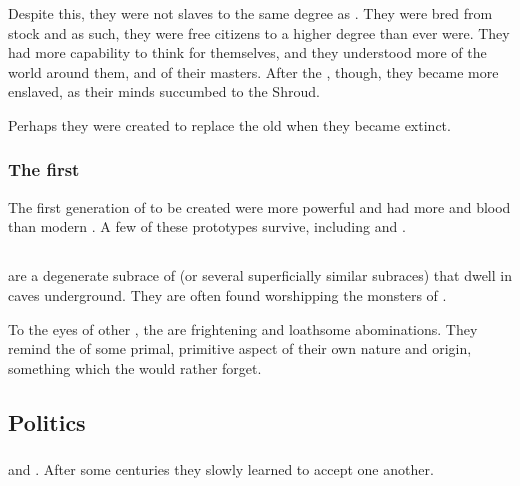 Despite this, they were not slaves to the same degree as \humans. 
They were bred from \naga{} stock and as such, they were free citizens to a higher degree than \humans{} ever were. 
They had more capability to think for themselves, and they understood more of the world around them, and of their masters. 
After the , though, they became more enslaved, as their minds succumbed to the Shroud.

Perhaps they were created to replace the old  when they became extinct. 





\subsubsection{The first \scathae}
The first generation of \scathae{} to be created were more powerful and had more \draconian{} and \xsic{} blood than modern \scathae. A few of these prototypes survive, including  and . 









\subsection{\Troglodytes}
\index{\troglodyte}
\Troglodytes{} are a degenerate subrace of \scathae{} (or several superficially similar subraces) that dwell in caves underground. They are often found worshipping the \daemonic{} monsters of . 

To the eyes of other \scathae, the \troglodytes{} are frightening and loathsome abominations. They remind the \scathae{} of some primal, primitive aspect of their own nature and origin, something which the \scathae{} would rather forget. 









\subsection{Politics}





\subsubsection{\Humans}
\Scathae and \humans {}.
After some centuries they slowly learned to accept one another. 
















